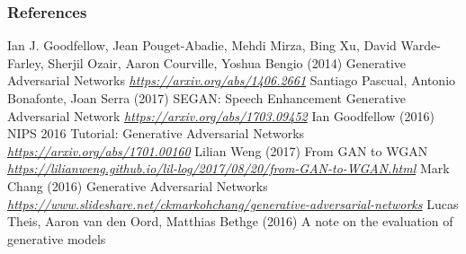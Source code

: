 \begin{vbframe}
\frametitle{References}
\footnotesize{
\begin{thebibliography}{99}
 Ian J. Goodfellow, Jean Pouget-Abadie, Mehdi Mirza, Bing Xu, David Warde-Farley, Sherjil Ozair, Aaron Courville, Yoshua Bengio (2014)
\newblock Generative Adversarial Networks
\newblock \emph{\url{https://arxiv.org/abs/1406.2661}}
 Santiago Pascual, Antonio Bonafonte, Joan Serra (2017)
\newblock SEGAN: Speech Enhancement Generative Adversarial Network
\newblock \emph{\url{https://arxiv.org/abs/1703.09452}}
 Ian Goodfellow (2016)
\newblock NIPS 2016 Tutorial: Generative Adversarial Networks
\newblock \emph{\url{https://arxiv.org/abs/1701.00160}}
 Lilian Weng (2017)
\newblock From GAN to WGAN
\newblock \emph{\url{https://lilianweng.github.io/lil-log/2017/08/20/from-GAN-to-WGAN.html}}
 Mark Chang (2016)
\newblock Generative Adversarial Networks
\newblock \emph{\url{https://www.slideshare.net/ckmarkohchang/generative-adversarial-networks}}
 Lucas Theis, Aaron van den Oord, Matthias Bethge (2016)
\newblock A note on the evaluation of generative models

\end{thebibliography}}
\end{vbframe}
